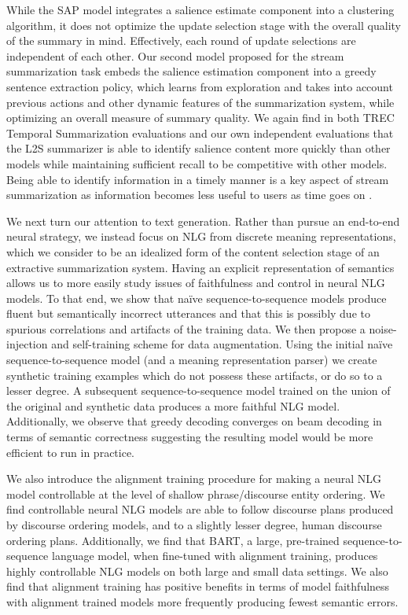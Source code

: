 While the SAP model integrates a salience estimate component into a clustering
algorithm, it does not optimize the update selection stage with the overall
quality of the summary in mind. Effectively, each round of update selections
are independent of each other. Our second model proposed for the stream
summarization task embeds the salience estimation component into a greedy
sentence extraction policy, which learns from exploration and takes into
account previous actions and other dynamic features of the summarization
system, while optimizing an overall measure of summary quality. We again find
in both TREC Temporal Summarization evaluations and our own independent
evaluations that the L2S summarizer is able to identify salience content more
quickly than other models while maintaining sufficient recall to be competitive
with other models. Being able to identify information in a timely manner is a
key aspect of stream summarization as information becomes less useful to users
as time goes on \citep{yomtov2011}.

We next turn our attention to text generation. Rather than pursue an end-to-end
neural strategy, we instead focus on NLG from discrete meaning representations,
which we consider to be an idealized form of the content selection stage of an
extractive summarization system. Having an explicit representation of semantics
allows us to more easily study issues of faithfulness and control in neural NLG
models.  To that end, we show that na{\"i}ve sequence-to-sequence models
produce fluent but semantically incorrect utterances and that this is possibly
due to spurious correlations and artifacts of the training data.  We then
propose a noise-injection and self-training scheme for data augmentation. Using
the initial na{\"ive} sequence-to-sequence model (and a meaning representation
parser) we create synthetic training examples which do not possess these
artifacts, or do so to a lesser degree. A subsequent sequence-to-sequence model
trained on the union of the original and synthetic data produces a more
faithful NLG model. Additionally, we observe that greedy decoding converges on
beam decoding in terms of semantic correctness suggesting the resulting model
would be more efficient to run in practice.

We also introduce the alignment training procedure for making a neural NLG
model controllable at the level of shallow phrase/discourse entity ordering.
We find controllable neural NLG models are able to follow discourse plans
produced by discourse ordering models, and to a slightly lesser degree, human
discourse ordering plans. Additionally, we find that BART, a large, pre-trained
sequence-to-sequence language model, when fine-tuned with alignment training,
produces highly controllable NLG models on both large and small data settings.
We also find that alignment training has positive benefits in terms of model
faithfulness with alignment trained models more frequently producing fewest
semantic errors.

